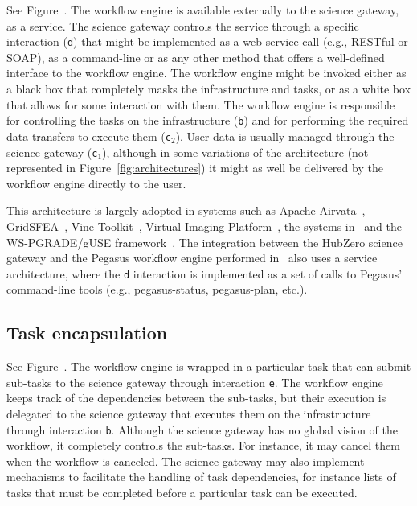 \documentclass[preprint,3p,twocolumn]{elsarticle}
\newcommand{\correction}[1]{\color{blue}#1\color{black}\xspace}
\begin{document}
See Figure~. The workflow engine is available
externally to the science gateway, as a service. The science gateway
controls the service through a specific interaction (\texttt{d}) that
might be implemented as a web-service call (e.g., RESTful or SOAP), as
a command-line or as any other method that offers a well-defined
interface to the workflow engine. The workflow engine might be invoked
either as a black box that completely masks the infrastructure and
tasks, or as a white box that allows for some interaction with
them. The workflow engine is responsible for controlling the tasks on
the infrastructure (\texttt{b}) and for performing the required data
transfers to execute them (\texttt{c$_2$}). User data is usually
managed through the science gateway (\texttt{c$_1$}), although in some
variations of the architecture (not represented in
Figure~\ref{fig:architectures}) it might as well be delivered by the
workflow engine directly to the user. 

This architecture is largely adopted in systems such as Apache
Airvata~\cite{marru2011apache}, GridSFEA~\cite{Elts2010}, Vine
Toolkit~\cite{DBLP:journals/scpe/SzejnfeldDKKKKLPTWDNW10}, Virtual
Imaging Platform~\cite{GLAT-13}, the systems
in~\cite{wu2010accelerating,shahand:2012jgc} and the WS-PGRADE/gUSE
framework~\cite{Kacsuk2012}. The integration between the HubZero
science gateway and the Pegasus workflow engine performed
in~\cite{CPE:CPE3257} also uses a service architecture, where the
\texttt{d} interaction is implemented as a set of calls to Pegasus'
command-line tools (e.g., pegasus-status, pegasus-plan,
etc.). 

\subsection{Task encapsulation}

See Figure~. The workflow engine is wrapped in
a particular task that can submit sub-tasks to the science gateway
through interaction \texttt{e}. The workflow engine keeps track of the
dependencies between the sub-tasks, but their execution is delegated
to the science gateway that executes them on the infrastructure
through interaction \texttt{b}. Although the science gateway has no
global vision of the workflow, it completely \correction{controls} the
sub-tasks. \correction{For instance, it may cancel} them when the
\correction{workflow} is canceled. The science gateway may also
implement mechanisms to facilitate the handling of task dependencies,
for instance \correction{lists of tasks that must be completed before a
  particular task can be executed}.
\end{document}
